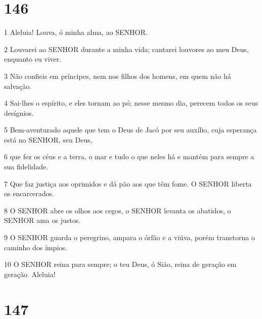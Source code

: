 \chapter{146}

\par 1 Aleluia! Louva, ó minha alma, ao SENHOR.
\par 2 Louvarei ao SENHOR durante a minha vida; cantarei louvores ao meu Deus, enquanto eu viver.
\par 3 Não confieis em príncipes, nem nos filhos dos homens, em quem não há salvação.
\par 4 Sai-lhes o espírito, e eles tornam ao pó; nesse mesmo dia, perecem todos os seus desígnios.
\par 5 Bem-aventurado aquele que tem o Deus de Jacó por seu auxílio, cuja esperança está no SENHOR, seu Deus,
\par 6 que fez os céus e a terra, o mar e tudo o que neles há e mantém para sempre a sua fidelidade.
\par 7 Que faz justiça aos oprimidos e dá pão aos que têm fome. O SENHOR liberta os encarcerados.
\par 8 O SENHOR abre os olhos aos cegos, o SENHOR levanta os abatidos, o SENHOR ama os justos.
\par 9 O SENHOR guarda o peregrino, ampara o órfão e a viúva, porém transtorna o caminho dos ímpios.
\par 10 O SENHOR reina para sempre; o teu Deus, ó Sião, reina de geração em geração. Aleluia!

\chapter{147}

